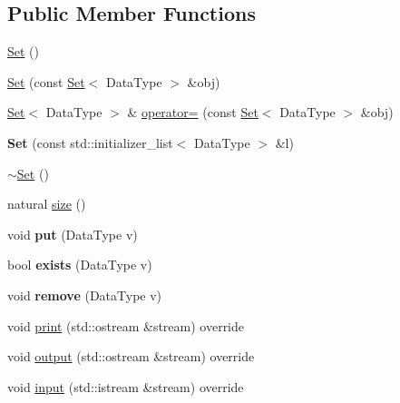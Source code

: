 \subsection*{Public Member Functions}
\begin{DoxyCompactItemize}
\item 
\hyperlink{classez_1_1objects_1_1Set_ac76e5e6f5cc80a3ad3d89b4ba8d8def4}{Set} ()
\item 
\hyperlink{classez_1_1objects_1_1Set_a98c649d945406b540cc6b733b296227f}{Set} (const \hyperlink{classez_1_1objects_1_1Set}{Set}$<$ Data\+Type $>$ \&obj)
\item 
\hyperlink{classez_1_1objects_1_1Set}{Set}$<$ Data\+Type $>$ \& \hyperlink{classez_1_1objects_1_1Set_a34b861364e501b39bc619daf9b4bc830}{operator=} (const \hyperlink{classez_1_1objects_1_1Set}{Set}$<$ Data\+Type $>$ \&obj)
\item 
\mbox{\label{classez_1_1objects_1_1Set_a41eac2c0a8d0652842c4d955f1af4d8d}} 
{\bfseries Set} (const std\+::initializer\+\_\+list$<$ Data\+Type $>$ \&l)
\item 
\hyperlink{classez_1_1objects_1_1Set_a14737e16cb0ebd77b9df7f6d76111149}{$\sim$\+Set} ()
\item 
natural \hyperlink{classez_1_1objects_1_1Set_afb546d4097dc6a89b5c114922139619d}{size} ()
\item 
\mbox{\label{classez_1_1objects_1_1Set_a0ac2a73e03177c02bfd64b51d048f380}} 
void {\bfseries put} (Data\+Type v)
\item 
\mbox{\label{classez_1_1objects_1_1Set_ad9c2657ac5174643fb7f4ef5ceebb089}} 
bool {\bfseries exists} (Data\+Type v)
\item 
\mbox{\label{classez_1_1objects_1_1Set_a684d3e24789bbb94cc530f19ddf001ce}} 
void {\bfseries remove} (Data\+Type v)
\item 
void \hyperlink{classez_1_1objects_1_1Set_a6fd40ec895d19ec7ab00cc8c55b505a1}{print} (std\+::ostream \&stream) override
\item 
void \hyperlink{classez_1_1objects_1_1Set_a1a98246f459de08368b425eae3720873}{output} (std\+::ostream \&stream) override
\item 
void \hyperlink{classez_1_1objects_1_1Set_a338e14cc6fe1afa7031a6f5f4959acf1}{input} (std\+::istream \&stream) override

\end{DoxyCompactItemize}
